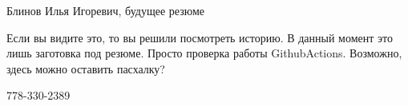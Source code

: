 \documentclass[10pt,a4paper]{article}
\begin{document}
\begin{center}
Блинов Илья Игоревич, будущее резюме
\end{center}
Если вы видите это, то вы решили посмотреть историю. В данный момент это лишь заготовка под резюме. Просто проверка работы GithubActions. Возможно, здесь можно оставить пасхалку? \\
\begin{center}
778-330-2389
\end{center}
\end{document}
